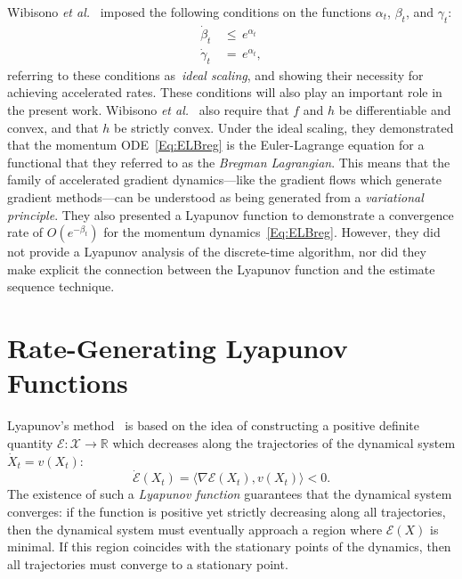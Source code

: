 \documentclass[11pt]{article}
\theoremstyle{plain}
\newcommand{\R}{{\mathbb R}}
\newcommand{\E}{{\mathcal E}}
\newcommand{\X}{{\mathcal X}}
\begin{document}
Wibisono \emph{et al.}~\cite{Acceleration} imposed the following conditions on the functions $\alpha_t$, $\beta_t$, and $\gamma_t$:
\begin{subequations}\label{Eq:IdeSca}
\begin{align}
\dot \beta_t \,&\leq\, e^{\alpha_t}   \label{Eq:IdeScaBet} \\
\dot \gamma_t \,&=\, e^{\alpha_t}  \label{Eq:IdeScaGam},
\end{align}
\end{subequations}
referring to these conditions as~\emph{ideal scaling}, and showing their necessity for achieving accelerated rates. These conditions will also play an important role in the present work.  Wibisono {\em et al.}~\cite{Acceleration} also require that  $f$ and $h$ be differentiable and convex, and that $h$ be strictly convex. Under the ideal scaling, they demonstrated that the momentum ODE~\eqref{Eq:ELBreg} is the Euler-Lagrange equation for a functional that they referred to as the {\em Bregman Lagrangian}. This means that the family of accelerated gradient dynamics---like the gradient flows which generate gradient methods---can be understood as being generated from a {\em variational principle}. They also presented a Lyapunov function to demonstrate a convergence rate of $O(e^{-\beta_t})$ for the momentum dynamics~\eqref{Eq:ELBreg}. However, they did not provide a Lyapunov analysis of the discrete-time algorithm, nor did they make explicit the connection between the Lyapunov function and the estimate sequence technique. 

\section{Rate-Generating Lyapunov Functions}
Lyapunov's method~\cite{Lyapunov} is based on the idea of constructing a positive definite quantity $\E: \X \rightarrow \R$ which decreases along the trajectories of the dynamical system $\dot X_t = v(X_t)$:
\begin{equation*}
\dot \E(X_t) =\langle \nabla \E(X_t), v(X_t)\rangle < 0.
\end{equation*}
The existence of such a \emph{Lyapunov function} guarantees that the dynamical system converges: if the function is positive yet strictly decreasing along all trajectories, then the dynamical system must eventually approach a region where $\E(X)$ is minimal.  If this region coincides with the stationary points of the dynamics, then all trajectories must converge to a stationary point.
\end{document}
